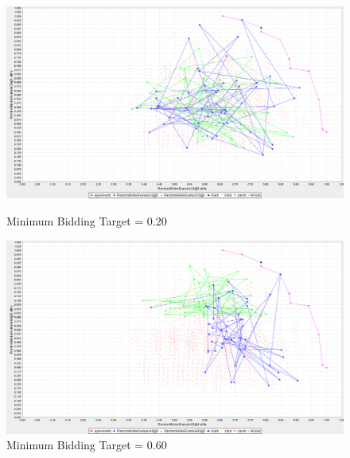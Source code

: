 \documentclass{article}
\begin{document}
\begin{enumerate}[label=(\alph*)]
\begin{figure}[ht]
  \includegraphics[width=\linewidth]{imgs/rb_20}
  \caption{Minimum Bidding Target = 0.20}
  \endminipage\hfill
  \includegraphics[width=\linewidth]{imgs/rb_60}
  \caption{Minimum Bidding Target = 0.60}
  \endminipage\hfill
\end{figure}


\end{enumerate}
\end{document}

